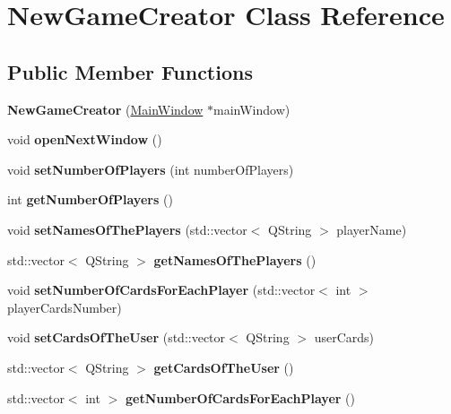 \hypertarget{classNewGameCreator}{}\section{New\+Game\+Creator Class Reference}
\label{classNewGameCreator}
\subsection*{Public Member Functions}
\begin{DoxyCompactItemize}
\item 
\mbox{\label{classNewGameCreator_a30b53bdda90bbf9f9ce8183e6e475274}} 
{\bfseries New\+Game\+Creator} (\hyperlink{classMainWindow}{Main\+Window} $\ast$main\+Window)
\item 
\mbox{\label{classNewGameCreator_aa3cc740c81a3264a352a9cac2a2c60eb}} 
void {\bfseries open\+Next\+Window} ()
\item 
\mbox{\label{classNewGameCreator_a6118892cee025ca10e05741387ce999c}} 
void {\bfseries set\+Number\+Of\+Players} (int number\+Of\+Players)
\item 
\mbox{\label{classNewGameCreator_acc48dac51f9b7cf2b2b6793f321ce144}} 
int {\bfseries get\+Number\+Of\+Players} ()
\item 
\mbox{\label{classNewGameCreator_a753d5ed531a6d57ed1418a696c66ddb2}} 
void {\bfseries set\+Names\+Of\+The\+Players} (std\+::vector$<$ Q\+String $>$ player\+Name)
\item 
\mbox{\label{classNewGameCreator_a1aac05c21a10a7e4709c831ac6e56b91}} 
std\+::vector$<$ Q\+String $>$ {\bfseries get\+Names\+Of\+The\+Players} ()
\item 
\mbox{\label{classNewGameCreator_abff5d40e11ad39ab4356af6717d88e83}} 
void {\bfseries set\+Number\+Of\+Cards\+For\+Each\+Player} (std\+::vector$<$ int $>$ player\+Cards\+Number)
\item 
\mbox{\label{classNewGameCreator_a14244649f919d6946d33c518932105f3}} 
void {\bfseries set\+Cards\+Of\+The\+User} (std\+::vector$<$ Q\+String $>$ user\+Cards)
\item 
\mbox{\label{classNewGameCreator_ac2905e16676010c2989674a8e18e2d9b}} 
std\+::vector$<$ Q\+String $>$ {\bfseries get\+Cards\+Of\+The\+User} ()
\item 
\mbox{\label{classNewGameCreator_a6bdc7ce36cc5c1bf2952ddd0167e6681}} 
std\+::vector$<$ int $>$ {\bfseries get\+Number\+Of\+Cards\+For\+Each\+Player} ()
\end{DoxyCompactItemize}
